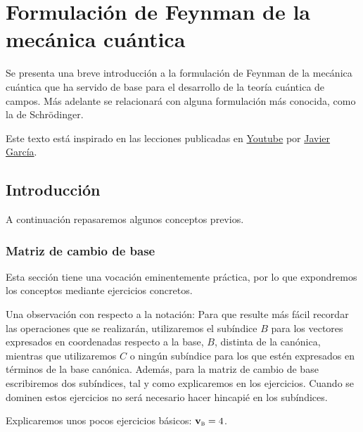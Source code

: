 %

\chapter{Formulación de Feynman de la mecánica cuántica}
Se presenta una breve introducción a la formulación de Feynman de la
mecánica cuántica que ha servido de base para el desarrollo de la
teoría cuántica de campos. Más adelante se relacionará con alguna
formulación más conocida, como la de Schrödinger.

Este texto está inspirado en las lecciones publicadas en
\href{https://www.youtube.com/watch?v=Ck0WwQiYTwo&list=PLAnA8FVrBl8DwNkN_3f_vahmE0PHjBWQM}
{Youtube}
por
\href{https://www.patreon.com/JavierGarcia/}
{Javier García}.

\section{Introducción}
A continuación repasaremos algunos conceptos previos.

\subsection{Matriz de cambio de base}
Esta sección tiene una vocación eminentemente práctica, por lo que
expondremos los conceptos mediante ejercicios concretos.

Una observación con respecto a la notación: Para que resulte más fácil
recordar las operaciones que se realizarán, utilizaremos el subíndice
$B$ para los vectores expresados en coordenadas respecto a la base,
$B$, distinta de la canónica, mientras que utilizaremos $C$ o ningún
subíndice para los que estén expresados en términos de la base
canónica. Además, para la matriz de cambio de base escribiremos dos
subíndices, tal y como explicaremos en los ejercicios. Cuando se
dominen estos ejercicios no será necesario hacer hincapié en los
subíndices.

Explicaremos unos pocos ejercicios básicos: $\mathbf{v}_{\textsc{b}} = 4$.

